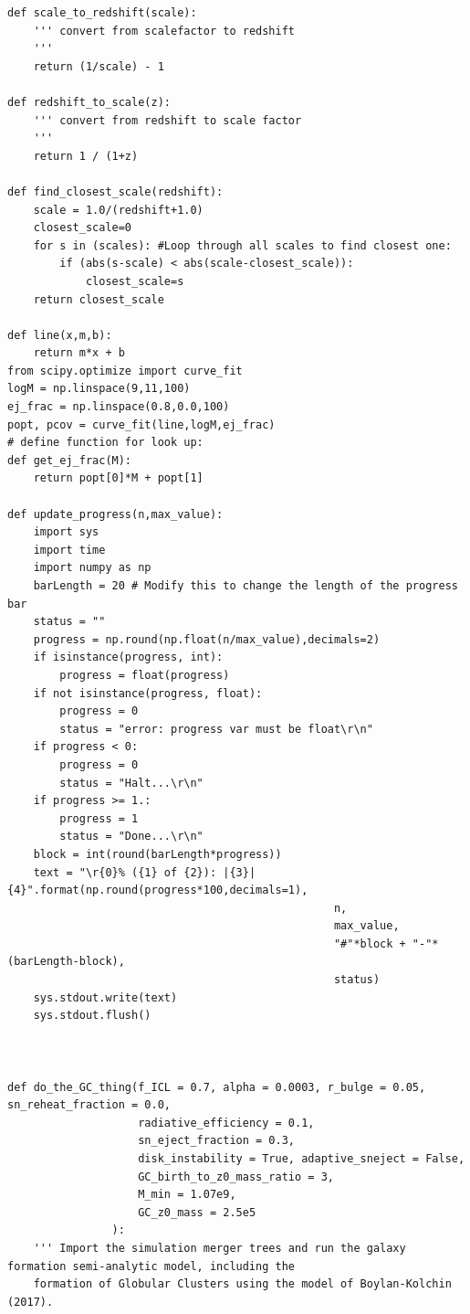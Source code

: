 \documentclass[onecolumn]{aastex62}
\begin{document}
\begin{verbatim}
def scale_to_redshift(scale):
    ''' convert from scalefactor to redshift
    '''
    return (1/scale) - 1

def redshift_to_scale(z):
    ''' convert from redshift to scale factor
    '''
    return 1 / (1+z)

def find_closest_scale(redshift):
    scale = 1.0/(redshift+1.0)
    closest_scale=0
    for s in (scales): #Loop through all scales to find closest one:
        if (abs(s-scale) < abs(scale-closest_scale)):
            closest_scale=s
    return closest_scale

def line(x,m,b):
    return m*x + b
from scipy.optimize import curve_fit
logM = np.linspace(9,11,100)
ej_frac = np.linspace(0.8,0.0,100)
popt, pcov = curve_fit(line,logM,ej_frac)
# define function for look up:
def get_ej_frac(M):
    return popt[0]*M + popt[1]

def update_progress(n,max_value):
    import sys
    import time
    import numpy as np
    barLength = 20 # Modify this to change the length of the progress bar
    status = ""
    progress = np.round(np.float(n/max_value),decimals=2)
    if isinstance(progress, int):
        progress = float(progress)
    if not isinstance(progress, float):
        progress = 0
        status = "error: progress var must be float\r\n"
    if progress < 0:
        progress = 0
        status = "Halt...\r\n"
    if progress >= 1.:
        progress = 1
        status = "Done...\r\n"
    block = int(round(barLength*progress))
    text = "\r{0}% ({1} of {2}): |{3}|  {4}".format(np.round(progress*100,decimals=1), 
                                                  n, 
                                                  max_value, 
                                                  "#"*block + "-"*(barLength-block), 
                                                  status)
    sys.stdout.write(text)
    sys.stdout.flush()



def do_the_GC_thing(f_ICL = 0.7, alpha = 0.0003, r_bulge = 0.05, sn_reheat_fraction = 0.0, 
                    radiative_efficiency = 0.1,
                    sn_eject_fraction = 0.3,
                    disk_instability = True, adaptive_sneject = False,
                    GC_birth_to_z0_mass_ratio = 3,
                    M_min = 1.07e9,
                    GC_z0_mass = 2.5e5
                ):
    ''' Import the simulation merger trees and run the galaxy formation semi-analytic model, including the
    formation of Globular Clusters using the model of Boylan-Kolchin (2017).


\end{verbatim}
\end{document}
